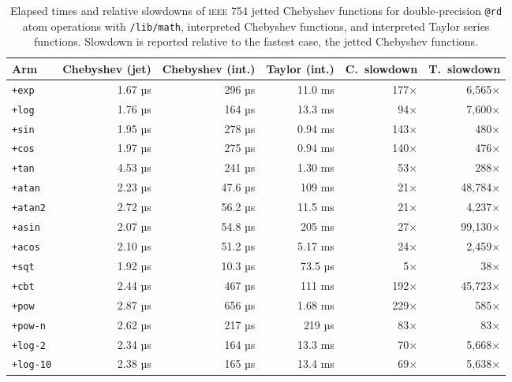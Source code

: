 \documentclass[twoside]{article}
\begin{document}
\begin{table}
\centering
\caption{Elapsed times and relative slowdowns of \textsc{ieee} 754 jetted Chebyshev functions for double-precision \texttt{@rd} atom operations with \texttt{/lib/math}, interpreted Chebyshev functions, and interpreted Taylor series functions.  Slowdown is reported relative to the fastest case, the jetted Chebyshev functions.}
\label{tab:jet}
\begin{tabular}{lrrrrr}
\toprule
Arm & Chebyshev (jet) & Chebyshev (int.) & Taylor (int.) & C.\ slowdown & T.\ slowdown \\
\midrule
\texttt{+exp} & 1.67 µs & 296 µs & 11.0 ms & 177× & 6,565× \\
\texttt{+log} & 1.76 µs & 164 µs & 13.3 ms & 94× & 7,600× \\
\texttt{+sin} & 1.95 µs & 278 µs & 0.94 ms & 143× & 480× \\
\texttt{+cos} & 1.97 µs & 275 µs & 0.94 ms & 140× & 476× \\
\texttt{+tan} & 4.53 µs & 241 µs & 1.30 ms & 53× & 288× \\
\texttt{+atan} & 2.23 µs & 47.6 µs & 109 ms & 21× & 48,784× \\
\texttt{+atan2} & 2.72 µs & 56.2 µs & 11.5 ms & 21× & 4,237× \\
\texttt{+asin} & 2.07 µs & 54.8 µs & 205 ms & 27× & 99,130× \\
\texttt{+acos} & 2.10 µs & 51.2 µs & 5.17 ms & 24× & 2,459× \\
\texttt{+sqt} & 1.92 µs & 10.3 µs & 73.5 µs & 5× & 38× \\
\texttt{+cbt} & 2.44 µs & 467 µs & 111 ms & 192× & 45,723× \\
\texttt{+pow} & 2.87 µs & 656 µs & 1.68 ms & 229× & 585× \\
\texttt{+pow-n} & 2.62 µs & 217 µs & 219 µs & 83× & 83× \\
\texttt{+log-2} & 2.34 µs & 164 µs & 13.3 ms & 70× & 5,668× \\
\texttt{+log-10} & 2.38 µs & 165 µs & 13.4 ms & 69× & 5,638× \\
\bottomrule
\end{tabular}
\end{table}
\end{document}
